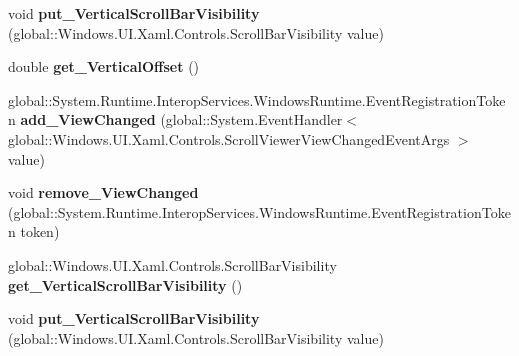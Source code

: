 \begin{DoxyCompactItemize}
\item 
\mbox{\label{interface_windows_1_1_u_i_1_1_xaml_1_1_controls_1_1_i_scroll_viewer_a881abbaa0ee412df9ed83e36357e1086}} 
void {\bfseries put\+\_\+\+Vertical\+Scroll\+Bar\+Visibility} (global\+::\+Windows.\+U\+I.\+Xaml.\+Controls.\+Scroll\+Bar\+Visibility value)
\item 
\mbox{\label{interface_windows_1_1_u_i_1_1_xaml_1_1_controls_1_1_i_scroll_viewer_a40e7998d40517b4dcca9be65562ea770}} 
double {\bfseries get\+\_\+\+Vertical\+Offset} ()
\item 
\mbox{\label{interface_windows_1_1_u_i_1_1_xaml_1_1_controls_1_1_i_scroll_viewer_a8195e80e232dd0a3a3e52e8060f878bc}} 
global\+::\+System.\+Runtime.\+Interop\+Services.\+Windows\+Runtime.\+Event\+Registration\+Token {\bfseries add\+\_\+\+View\+Changed} (global\+::\+System.\+Event\+Handler$<$ global\+::\+Windows.\+U\+I.\+Xaml.\+Controls.\+Scroll\+Viewer\+View\+Changed\+Event\+Args $>$ value)
\item 
\mbox{\label{interface_windows_1_1_u_i_1_1_xaml_1_1_controls_1_1_i_scroll_viewer_a3176001cb06e45e61bbee6a898c4c7b3}} 
void {\bfseries remove\+\_\+\+View\+Changed} (global\+::\+System.\+Runtime.\+Interop\+Services.\+Windows\+Runtime.\+Event\+Registration\+Token token)
\item 
\mbox{\label{interface_windows_1_1_u_i_1_1_xaml_1_1_controls_1_1_i_scroll_viewer_aac8cb7fc3dab5e040635188c0f681107}} 
global\+::\+Windows.\+U\+I.\+Xaml.\+Controls.\+Scroll\+Bar\+Visibility {\bfseries get\+\_\+\+Vertical\+Scroll\+Bar\+Visibility} ()
\item 
\mbox{\label{interface_windows_1_1_u_i_1_1_xaml_1_1_controls_1_1_i_scroll_viewer_a881abbaa0ee412df9ed83e36357e1086}} 
void {\bfseries put\+\_\+\+Vertical\+Scroll\+Bar\+Visibility} (global\+::\+Windows.\+U\+I.\+Xaml.\+Controls.\+Scroll\+Bar\+Visibility value)
\item 

\end{DoxyCompactItemize}
